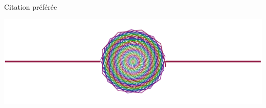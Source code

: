 \strut\vspace{3.42cm}\newline

{\pageFont\LARGE
\hfill Citation préférée \hspace{2cm}}
\newline\vspace{0.42cm}

\begin{center}
\includegraphics[width=0.25\linewidth]{Texte/Partie0/Preface/rond.png}
\end{center}